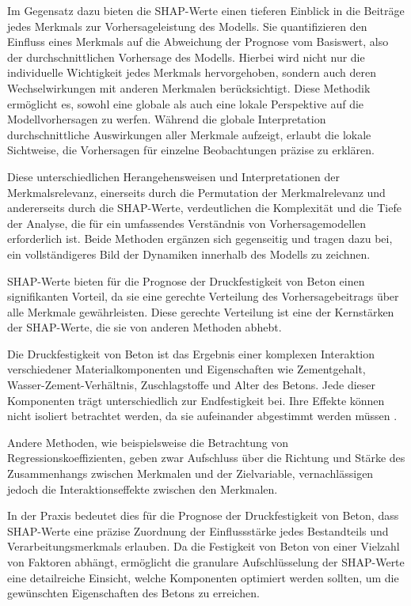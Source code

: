 Im Gegensatz dazu bieten die SHAP-Werte einen tieferen Einblick in die Beiträge jedes Merkmals zur Vorhersageleistung des Modells. 
Sie quantifizieren den Einfluss eines Merkmals auf die Abweichung der Prognose vom Basiswert, also der durchschnittlichen Vorhersage des Modells. 
Hierbei wird nicht nur die individuelle Wichtigkeit jedes Merkmals hervorgehoben, sondern auch deren Wechselwirkungen mit anderen 
Merkmalen berücksichtigt. Diese Methodik ermöglicht es, sowohl eine globale als auch eine lokale Perspektive auf die Modellvorhersagen zu werfen. 
Während die globale Interpretation durchschnittliche Auswirkungen aller Merkmale aufzeigt, erlaubt die lokale Sichtweise, die Vorhersagen 
für einzelne Beobachtungen präzise zu erklären.

Diese unterschiedlichen Herangehensweisen und Interpretationen der Merkmalsrelevanz, einerseits durch die 
Permutation der Merkmalrelevanz und andererseits durch die SHAP-Werte, verdeutlichen die Komplexität und die Tiefe der Analyse, 
die für ein umfassendes Verständnis von Vorhersagemodellen erforderlich ist. Beide Methoden ergänzen sich gegenseitig und tragen dazu bei, 
ein vollständigeres Bild der Dynamiken innerhalb des Modells zu zeichnen.

SHAP-Werte bieten für die Prognose der Druckfestigkeit von Beton einen signifikanten Vorteil, 
da sie eine gerechte Verteilung des Vorhersagebeitrags über alle Merkmale gewährleisten. 
Diese gerechte Verteilung ist eine der Kernstärken der 
SHAP-Werte, die sie von anderen Methoden abhebt.

Die Druckfestigkeit von Beton ist das Ergebnis einer komplexen Interaktion verschiedener 
Materialkomponenten und Eigenschaften wie Zementgehalt, Wasser-Zement-Verhältnis, 
Zuschlagstoffe und Alter des Betons. Jede dieser Komponenten trägt unterschiedlich 
zur Endfestigkeit bei. Ihre Effekte können nicht isoliert betrachtet werden, 
da sie aufeinander abgestimmt werden müssen \cite[S. 2]{Nandhini2021}.

Andere Methoden, wie beispielsweise die Betrachtung von Regressionskoeffizienten, 
geben zwar Aufschluss über die Richtung und Stärke des Zusammenhangs zwischen Merkmalen 
und der Zielvariable, vernachlässigen jedoch die Interaktionseffekte zwischen den Merkmalen.

In der Praxis bedeutet dies für die Prognose der Druckfestigkeit von Beton, 
dass SHAP-Werte eine präzise Zuordnung der Einflussstärke jedes Bestandteils 
und Verarbeitungsmerkmals erlauben. Da die Festigkeit von Beton von einer Vielzahl von 
Faktoren abhängt, ermöglicht die granulare Aufschlüsselung der SHAP-Werte eine 
detailreiche Einsicht, welche Komponenten optimiert werden sollten, um die gewünschten 
Eigenschaften des Betons zu erreichen.

